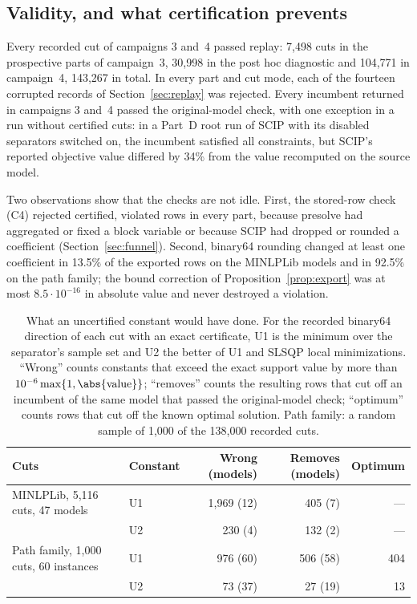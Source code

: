 \subsection{Validity, and what certification prevents}\label{sec:validity}

Every recorded cut of campaigns 3 and~4 passed replay: 7{,}498 cuts in the
prospective parts of campaign~3, 30{,}998 in the post hoc diagnostic and
104{,}771 in campaign~4, 143{,}267 in total. In every part and cut mode, each of
the fourteen corrupted records of Section~\ref{sec:replay} was rejected. Every
incumbent returned in campaigns 3 and~4 passed the original-model check, with
one exception in a run without certified cuts: in a Part~D root run of SCIP
with its disabled separators switched on, the incumbent satisfied all
constraints, but SCIP's reported objective value differed by 34\% from the value
recomputed on the source model.

Two observations show that the checks are not idle. First, the stored-row
check (C4) rejected certified, violated rows in every part, because presolve
had aggregated or fixed a block variable or because SCIP had dropped or
rounded a coefficient (Section~\ref{sec:funnel}). Second, binary64 rounding
changed at least one coefficient in 13.5\% of the exported rows on the MINLPLib
models and in 92.5\% on the path family; the bound correction of
Proposition~\ref{prop:export} was at most $8.5\cdot10^{-16}$ in absolute value
and never destroyed a violation.

\begin{table}[t]
\centering\footnotesize
\caption{What an uncertified constant would have done. For the recorded
binary64 direction of each cut with an exact certificate, U1 is the minimum
over the separator's sample set and U2 the better of U1 and SLSQP local
minimizations. ``Wrong'' counts constants that exceed the exact support value
by more than $10^{-6}\max\{1,\abs{\text{value}}\}$; ``removes'' counts the
resulting rows that cut off an incumbent of the same model that passed the
original-model check; ``optimum'' counts rows that cut off the known optimal
solution. Path family: a random sample of 1{,}000 of the 138{,}000 recorded
cuts.}\label{tab:ablation}
\begin{tabular}{@{}llrrr@{}}
\toprule
Cuts & Constant & Wrong (models) & Removes (models) & Optimum\\
\midrule
MINLPLib, 5{,}116 cuts, 47 models & U1 & 1{,}969 (12) & 405 (7) & ---\\
 & U2 & 230 (4) & 132 (2) & ---\\
\midrule
Path family, 1{,}000 cuts, 60 instances & U1 & 976 (60) & 506 (58) & 404\\
 & U2 & 73 (37) & 27 (19) & 13\\
\bottomrule
\end{tabular}
\end{table}

